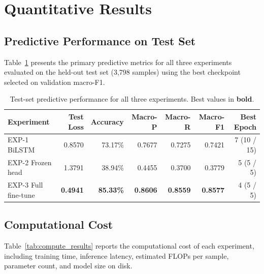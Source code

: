 \section{Quantitative Results}

\subsection{Predictive Performance on Test Set}

Table~\ref{tab:main_results} presents the primary predictive metrics for all three experiments evaluated on the held-out test set (3,798 samples) using the best checkpoint selected on validation macro-F1.

\begin{table}[H]
    \centering
    \caption{Test-set predictive performance for all three experiments. Best values in \textbf{bold}.}
    \label{tab:main_results}
    \begin{tabularx}{\textwidth}{l r r r r r r}
        \toprule
        \textbf{Experiment} & \textbf{Test Loss} & \textbf{Accuracy} & \textbf{Macro-P} & \textbf{Macro-R} & \textbf{Macro-F1} & \textbf{Best Epoch} \\
        \midrule
        EXP-1 BiLSTM       & 0.8570 & 73.17\%        & 0.7677        & 0.7275        & 0.7421        & 7 (10 / 15) \\
        EXP-2 Frozen head  & 1.3791 & 38.94\%        & 0.4455        & 0.3700        & 0.3779        & 5 (5 / 5) \\
        EXP-3 Full fine-tune & \textbf{0.4941} & \textbf{85.33\%} & \textbf{0.8606} & \textbf{0.8559} & \textbf{0.8577} & 4 (5 / 5) \\
        \bottomrule
    \end{tabularx}
\end{table}

\subsection{Computational Cost}

Table~\ref{tab:compute_results} reports the computational cost of each experiment, including training time, inference latency, estimated FLOPs per sample, parameter count, and model size on disk.

